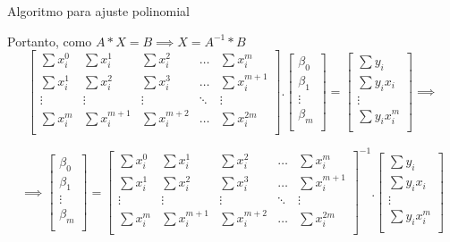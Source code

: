\documentclass[10pt]{beamer}
\begin{document}
\begin{frame}[fragile]{Algoritmo para ajuste polinomial}
  
  Portanto, como $A * X = B \implies X = A^{-1} * B$
  \[
    \begin{bmatrix}
      \sum{x_{i}^{0}} & \sum{x_{i}^{1}} & \sum{x_{i}^{2}} & \dots  & \sum{x_{i}^{m}} \\
      \sum{x_{i}^{1}} & \sum{x_{i}^{2}} & \sum{x_{i}^{3}} & \dots & \sum{x_{i}^{m+1}}\\
      \vdots & \vdots & \vdots & \ddots & \vdots \\
      \sum{x_{i}^{m}} & \sum{x_{i}^{m+1}} & \sum{x_{i}^{m+2}} & \dots  & \sum{x_{i}^{2m}} \\
    \end{bmatrix}
    .
    \begin{bmatrix}
      \beta_0 \\
      \beta_1 \\
      \vdots  \\
      \beta_m \\
    \end{bmatrix}
    =
    \begin{bmatrix}
      \sum{y_{i}} \\
      \sum{y_{i}x_{i}}\\
      \vdots \\
      \sum{y_{i}x_{i}^{m}} \\
    \end{bmatrix}
    \implies
  \]

  \[
    \implies
    \begin{bmatrix}
      \beta_0 \\
      \beta_1 \\
      \vdots  \\
      \beta_m \\
    \end{bmatrix}
    =
    \begin{bmatrix}
      \sum{x_{i}^{0}} & \sum{x_{i}^{1}} & \sum{x_{i}^{2}} & \dots  & \sum{x_{i}^{m}} \\
      \sum{x_{i}^{1}} & \sum{x_{i}^{2}} & \sum{x_{i}^{3}} & \dots & \sum{x_{i}^{m+1}}\\
      \vdots & \vdots & \vdots & \ddots & \vdots \\
      \sum{x_{i}^{m}} & \sum{x_{i}^{m+1}} & \sum{x_{i}^{m+2}} & \dots  & \sum{x_{i}^{2m}} \\
    \end{bmatrix}^{-1}
    .
    \begin{bmatrix}
      \sum{y_{i}} \\
      \sum{y_{i}x_{i}}\\
      \vdots \\
      \sum{y_{i}x_{i}^{m}} \\
    \end{bmatrix}
  \]

\end{frame}
\end{document}
